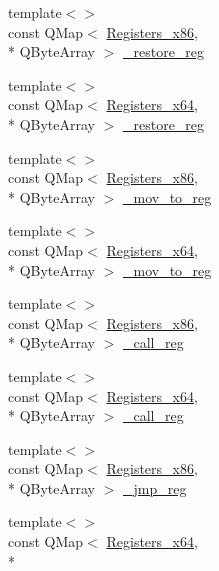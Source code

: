 \begin{DoxyCompactItemize}
{\footnotesize template$<$$>$ }\\const Q\-Map$<$ \hyperlink{codedefines_8h_a0f84efe4ca4d99203713a78bd6e8c82e}{Registers\-\_\-x86}, \\*
Q\-Byte\-Array $>$ \hyperlink{class_code_defines_ace7e27a0e9f56bda11478fd15508ee22}{\-\_\-restore\-\_\-reg}
\item 
{\footnotesize template$<$$>$ }\\const Q\-Map$<$ \hyperlink{codedefines_8h_a5e15b5c4d766f6faf29b5bcec37bde5c}{Registers\-\_\-x64}, \\*
Q\-Byte\-Array $>$ \hyperlink{class_code_defines_ad812618bbc99e6f3cf7c4c479717287a}{\-\_\-restore\-\_\-reg}
\item 
{\footnotesize template$<$$>$ }\\const Q\-Map$<$ \hyperlink{codedefines_8h_a0f84efe4ca4d99203713a78bd6e8c82e}{Registers\-\_\-x86}, \\*
Q\-Byte\-Array $>$ \hyperlink{class_code_defines_afe0840112fe7ec438473673cd3a3742d}{\-\_\-mov\-\_\-to\-\_\-reg}
\item 
{\footnotesize template$<$$>$ }\\const Q\-Map$<$ \hyperlink{codedefines_8h_a5e15b5c4d766f6faf29b5bcec37bde5c}{Registers\-\_\-x64}, \\*
Q\-Byte\-Array $>$ \hyperlink{class_code_defines_a449469454d18e0876cbeecb72675d8c9}{\-\_\-mov\-\_\-to\-\_\-reg}
\item 
{\footnotesize template$<$$>$ }\\const Q\-Map$<$ \hyperlink{codedefines_8h_a0f84efe4ca4d99203713a78bd6e8c82e}{Registers\-\_\-x86}, \\*
Q\-Byte\-Array $>$ \hyperlink{class_code_defines_ab6b048a474ce70608922e1633e773c3e}{\-\_\-call\-\_\-reg}
\item 
{\footnotesize template$<$$>$ }\\const Q\-Map$<$ \hyperlink{codedefines_8h_a5e15b5c4d766f6faf29b5bcec37bde5c}{Registers\-\_\-x64}, \\*
Q\-Byte\-Array $>$ \hyperlink{class_code_defines_a21021e0355d5f85841cea97c1cd4b30f}{\-\_\-call\-\_\-reg}
\item 
{\footnotesize template$<$$>$ }\\const Q\-Map$<$ \hyperlink{codedefines_8h_a0f84efe4ca4d99203713a78bd6e8c82e}{Registers\-\_\-x86}, \\*
Q\-Byte\-Array $>$ \hyperlink{class_code_defines_acd2f12cbe56f2062903481b2b94a4950}{\-\_\-jmp\-\_\-reg}
\item 
{\footnotesize template$<$$>$ }\\const Q\-Map$<$ \hyperlink{codedefines_8h_a5e15b5c4d766f6faf29b5bcec37bde5c}{Registers\-\_\-x64}, \\*

\end{DoxyCompactItemize}

